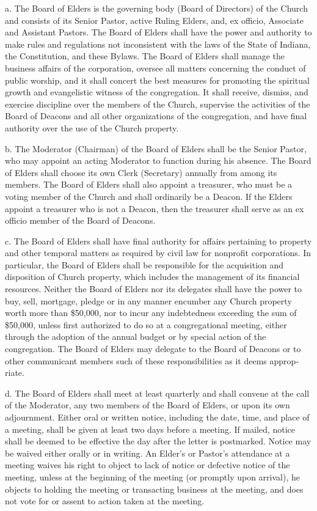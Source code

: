 \documentclass[
]{book}
\begin{document}
a. The Board of Elders is the governing body (Board of Directors) of the Church and consists of its Senior Pastor, active Ruling Elders, and, ex officio, Associate and Assistant Pastors. The Board of Elders shall have the power and authority to make rules and regulations not inconsistent with the laws of the State of Indiana, the Constitution, and these Bylaws. The Board of Elders shall manage the business affairs of the corporation, oversee all matters concerning the conduct of public worship, and it shall concert the best measures for promoting the spiritual growth and evangel­istic witness of the congregation. It shall receive, dismiss, and exercise discipline over the members of the Church, supervise the activities of the Board of Deacons and all other organizations of the congregation, and have final authority over the use of the Church property.

b. The Moderator (Chairman) of the Board of Elders shall be the Senior Pastor, who may appoint an acting Moderator to function during his absence. The Board of Elders shall choose its own Clerk (Secretary) annually from among its members. The Board of Elders shall also appoint a treasurer, who must be a voting member of the Church and shall ordinarily be a Deacon. If the Elders appoint a treasurer who is not a Deacon, then the treasurer shall serve as an ex officio member of the Board of Deacons.

c. The Board of Elders shall have final authority for affairs pertaining to property and other temporal matters as required by civil law for nonprofit corporations. In particular, the Board of Elders shall be responsible for the acquisition and disposition of Church property, which includes the management of its financial resources. Neither the Board of Elders nor its delegates shall have the power to buy, sell, mortgage, pledge or in any manner encumber any Church property worth more than \$50,000, nor to incur any indebted­ness exceeding the sum of \$50,000, unless first authorized to do so at a congregational meeting, either through the adoption of the annual budget or by special action of the congregation. The Board of Elders may delegate to the Board of Deacons or to other communicant members such of these responsibilities as it deems approp­riate.

d. The Board of Elders shall meet at least quarterly and shall convene at the call of the Moderator, any two members of the Board of Elders, or upon its own adjournment. Either oral or written notice, including the date, time, and place of a meeting, shall be given at least two days before a meeting. If mailed, notice shall be deemed to be effective the day after the letter is postmarked. Notice may be waived either orally or in writing. An Elder's or Pastor's attendance at a meeting waives his right to object to lack of notice or defective notice of the meeting, unless at the beginning of the meeting (or promptly upon arrival), he objects to holding the meeting or transacting business at the meeting, and does not vote for or assent to action taken at the meeting.
\end{document}
